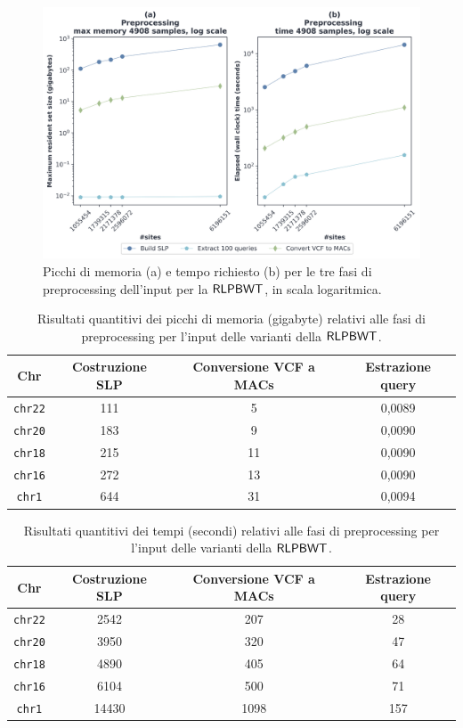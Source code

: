 \begin{figure}
  \centering
  \includegraphics[width=\linewidth]{img/prep_mem_time.png}
  \caption{Picchi di memoria (a) e tempo richiesto (b) per le tre fasi di
    preprocessing dell'input per la $\mbox{\rm {\sf RLPBWT}}$, in scala logaritmica.}
  \label{fig:prechr}
\end{figure}
\begin{table}
  \centering
  \small
  \caption{Risultati quantitivi dei picchi di memoria (gigabyte) relativi alle
    fasi di 
    preprocessing per l'input delle varianti della $\mbox{\rm {\sf RLPBWT}}$.}
  \label{tab:prepmem}
  \begin{tabular}{c||c|c|c}
    \textbf{Chr} & \textbf{Costruzione SLP} & \textbf{Conversione VCF a MACs}
    & \textbf{Estrazione query}\\
    \hline
    \hline
    \texttt{chr22} & 111 & 5 & 0,0089  \\
    \texttt{chr20} & 183 & 9 & 0,0090 \\
    \texttt{chr18} & 215 & 11 & 0,0090 \\
    \texttt{chr16} & 272 & 13 & 0,0090 \\
    \texttt{chr1} & 644 & 31 & 0,0094 
  \end{tabular}
\end{table}
\begin{table}
  \centering
  \small
  \caption{Risultati quantitivi dei tempi (secondi) relativi alle fasi di
    preprocessing per l'input delle varianti della $\mbox{\rm {\sf RLPBWT}}$.}
  \label{tab:preptime}
  \begin{tabular}{c||c|c|c}
    \textbf{Chr} & \textbf{Costruzione SLP} & \textbf{Conversione VCF a MACs}
    & \textbf{Estrazione query}\\
    \hline
    \hline
    \texttt{chr22} & 2542 & 207 & 28 \\
    \texttt{chr20} & 3950 & 320 & 47 \\
    \texttt{chr18} & 4890 & 405 & 64 \\
    \texttt{chr16} & 6104 & 500 & 71 \\
    \texttt{chr1} & 14430 & 1098 & 157
  \end{tabular}
\end{table}
